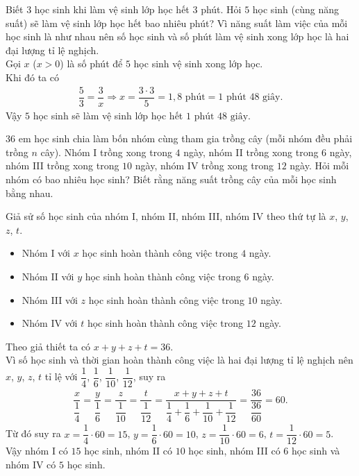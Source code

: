\begin{bt}%
 Biết $3$ học sinh khi làm vệ sinh lớp học hết $3$ phút. Hỏi $5$ học sinh (cùng năng suất) sẽ làm vệ sinh lớp học hết bao nhiêu phút?
 \loigiai
  {
  Vì năng suất làm việc của mỗi học sinh là như nhau nên số học sinh và số phút làm vệ sinh xong lớp học là hai đại lượng tỉ lệ nghịch.\\
  Gọi $x$ ($x>0$) là số phút để $5$ học sinh vệ sinh xong lớp học.\\
  Khi đó ta có
  \begin{eqnarray*}
   \dfrac{5}{3} = \dfrac{3}{x} \Rightarrow x=\dfrac{3 \cdot 3}{5} = 1{,}8 \text{ phút} = 1 \text{ phút } 48 \text{ giây}.
  \end{eqnarray*}
  Vậy $5$ học sinh sẽ làm vệ sinh lớp học hết $1 \text{ phút } 48 \text{ giây}$.
  }
\end{bt}

\begin{bt}%
 $36$ em học sinh chia làm bốn nhóm cùng tham gia trồng cây (mỗi nhóm đều phải trồng $n$ cây). Nhóm I trồng xong trong $4$ ngày, nhóm II trồng xong trong $6$ ngày, nhóm III trồng xong trong $10$ ngày, nhóm IV trồng xong trong $12$ ngày. Hỏi mỗi nhóm có bao nhiêu học sinh? Biết rằng năng suất trồng cây của mỗi học sinh bằng nhau.
 \loigiai
  {
  Giả sử số học sinh của nhóm I, nhóm II, nhóm III, nhóm IV theo thứ tự là $x$, $y$, $z$, $t$.
  \begin{itemize}
   \item Nhóm I với $x$ học sinh hoàn thành công việc trong $4$ ngày.
   \item Nhóm II với $y$ học sinh hoàn thành công việc trong $6$ ngày.
   \item Nhóm III với $z$ học sinh hoàn thành công việc trong $10$ ngày.
   \item Nhóm IV với $t$ học sinh hoàn thành công việc trong $12$ ngày.
  \end{itemize}
  Theo giả thiết ta có $x+y+z+t=36$.\\
  Vì số học sinh và thời gian hoàn thành công việc là hai đại lượng tỉ lệ nghịch nên $x$, $y$, $z$, $t$ tỉ lệ với $\dfrac{1}{4}$, $\dfrac{1}{6}$, $\dfrac{1}{10}$, $\dfrac{1}{12}$, suy ra
  \begin{eqnarray*}
  	\dfrac{x}{\dfrac{1}{4}} = \dfrac{y}{\dfrac{1}{6}} = \dfrac{z}{\dfrac{1}{10}} = \dfrac{t}{\dfrac{1}{12}} = \dfrac{x+y+z+t}{\dfrac{1}{4}+\dfrac{1}{6}+\dfrac{1}{10}+\dfrac{1}{12}} = \dfrac{36}{\dfrac{36}{60}} = 60.
  \end{eqnarray*}
  Từ đó suy ra $x=\dfrac{1}{4} \cdot 60 = 15$, $y=\dfrac{1}{6} \cdot 60 = 10$, $z=\dfrac{1}{10} \cdot 60 = 6$, $t=\dfrac{1}{12} \cdot 60 = 5$.\\
  Vậy nhóm I có $15$ học sinh, nhóm II có $10$ học sinh, nhóm III có $6$ học sinh và nhóm IV có $5$ học sinh.
  }
\end{bt}

